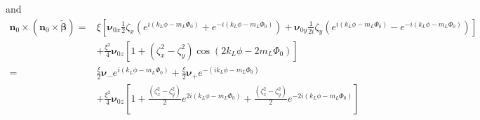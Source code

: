 and
\begin{align}
    {\bm n}_0\times({\bm n}_0\times\tilde{\boldsymbol{\beta}})  = & \xi\left[{\boldsymbol{\nu}}_{0x}\frac12\zeta_x\left(e^{i(k_L\phi -m_L\varPhi_0)}+e^{-i(k_L\phi-m_L\varPhi_0)}\right)+{\boldsymbol{\nu}}_{0y}\frac1{2i}\zeta_y\left(e^{i(k_L\phi -m_L\varPhi_0)}-e^{-i(k_L\phi-m_L\varPhi_0)}\right)\right]\nonumber \\
                                                                  & + \frac{\xi^2}4{\boldsymbol{\nu}_{0z}}\left[1+(\zeta_x^2-\zeta_y^2)\cos(2k_L\phi-2m_L\varPhi_0)\right]                                                                                                                                              \\
    =                                                             & \frac{\xi}2{\boldsymbol{\nu}}_{-} e^{i(k_L\phi -m_L\varPhi_0)}+\frac{\xi}2{\boldsymbol{\nu}}_{+}e^{-(ik_L\phi -m_L\varPhi_0)}\nonumber                                                                                                              \\&+\frac{\xi^2}4{\boldsymbol{\nu}_{0z}}\left[1+\frac{(\zeta_x^2-\zeta_y^2)}2e^{2i(k_L\phi-m_L\varPhi_0)}+\frac{(\zeta_x^2-\zeta_y^2)}2e^{-2i(k_L\phi-m_L\varPhi_0)}\right]\end{align}

